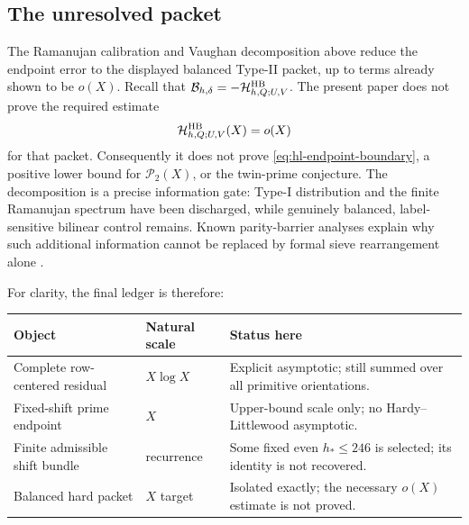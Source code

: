 \subsection{The unresolved packet}

The Ramanujan calibration and Vaughan decomposition above reduce the
endpoint error to the displayed balanced Type-II packet, up to terms already
shown to be $o(X)$.  Recall that
$\mathcal B_{h,\delta}=-\mathcal H^{\rm HB}_{h,Q;U,V}$.  The present paper does not prove
the required estimate
\begin{equation}
 \mathcal H^{\rm HB}_{h,Q;U,V}(X)=o(X)
 \label{eq:hard-packet-unproved}
\end{equation}
for that packet.  Consequently it does not prove
\eqref{eq:hl-endpoint-boundary}, a positive lower bound for
$\mathcal P_2(X)$, or the twin-prime conjecture.  The decomposition is a precise
information gate: Type-I distribution and the finite Ramanujan spectrum
have been discharged, while genuinely balanced, label-sensitive bilinear
control remains.  Known parity-barrier analyses explain why such additional
information cannot be replaced by formal sieve rearrangement alone
\citep{Selberg1952Parity,FordMaynard2024}.

For clarity, the final ledger is therefore:
\begin{center}
\begin{tabular}{@{}>{\raggedright\arraybackslash}p{}
                    >{\raggedright\arraybackslash}p{}
                    >{\raggedright\arraybackslash}p{}@{}}
\toprule
Object & Natural scale & Status here \\
\midrule
Complete row-centered residual & $X\log X$ & Explicit asymptotic; still
summed over all primitive orientations. \\
Fixed-shift prime endpoint & $X$ & Upper-bound scale only; no
Hardy--Littlewood asymptotic. \\
Finite admissible shift bundle & recurrence & Some fixed even
$h_*\le246$ is selected; its identity is not recovered. \\
Balanced hard packet & $X$ target & Isolated exactly; the necessary
$o(X)$ estimate is not proved. \\
\bottomrule
\end{tabular}
\end{center}
